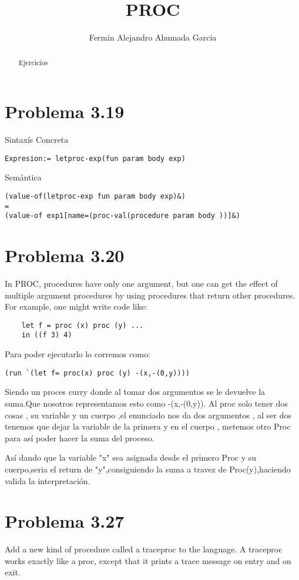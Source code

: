 \documentclass{article}
\title{PROC}
\author{Fermin Alejandro Ahumada Garcia}
\begin{document}
\maketitle

\begin{abstract}
Ejercicios
\end{abstract}
\section{Problema 3.19}
Sintaxís Concreta
\begin{lstlisting}
Expresion:= letproc-exp(fun param body exp)
\end{lstlisting}
Semántica
\begin{lstlisting}
(value-of(letproc-exp fun param body exp)&)
=
(value-of exp1[name=(proc-val(procedure param body ))]&)
\end{lstlisting}
\section{Problema 3.20}
In PROC, procedures have only one argument, but one can get the
effect of multiple argument procedures by using procedures that return other procedures.
For example, one might write code like:
\begin{lstlisting}
    let f = proc (x) proc (y) ...
    in ((f 3) 4)
\end{lstlisting}
Para poder ejecutarlo lo corremos como:
\begin{lstlisting}
(run `(let f= proc(x) proc (y) -(x,-(0,y))))
\end{lstlisting}
Siendo un proces curry donde al tomar dos argumentos se le devuelve la suma.Que nosotros representamos esto como -(x,-(0,y)).
Al proc solo tener dos cosas , su variable y un cuerpo ,el enunciado nos da dos argumentos , al ser dos tenemos que dejar la variable de la primera y en el cuerpo , metemos otro Proc para así poder hacer la suma del proceso.

Así dando que la variable "x" sea asignada desde el primero Proc y su cuerpo,seria el return de "y",consiguiendo la suma a travez de Proc(y),haciendo valida la interpretación.
\section{Problema 3.27}
Add a new kind of procedure called a traceproc to the language.
A traceproc works exactly like a proc, except that it prints a trace message on
entry and on exit.
\end{document}

